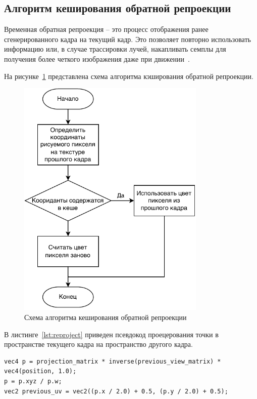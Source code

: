 \subsection{Алгоритм кеширования обратной репроекции}

Временная обратная репроекция -- это процесс отображения ранее сгенерированного кадра на 
текущий кадр. Это позволяет повторно использовать информацию или, в случае трассировки 
лучей, накапливать семплы для получения более четкого изображения даже при 
движении~\cite{ARTSwRPC}.

На рисунке~\ref{img:rrc} представлена схема алгоритма кэширования обратной
репроекции.

\begin{figure}[H]
	\centering
	\includegraphics[width=90mm]{inc/pdf/rrc}
	\caption{Схема алгоритма кеширования обратной репроекции}
	\label{img:rrc}
\end{figure}

В листинге~\ref{lst:reproject} приведен псевдокод проецерования точки в пространстве 
текущего кадра на пространство другого кадра.

\begin{lstlisting}[caption={Проецирование одного кадра на другой},label={lst:reproject},frame=single]
vec4 p = projection_matrix * inverse(previous_view_matrix) * vec4(position, 1.0);
p = p.xyz / p.w;
vec2 previous_uv = vec2((p.x / 2.0) + 0.5, (p.y / 2.0) + 0.5);
\end{lstlisting}

